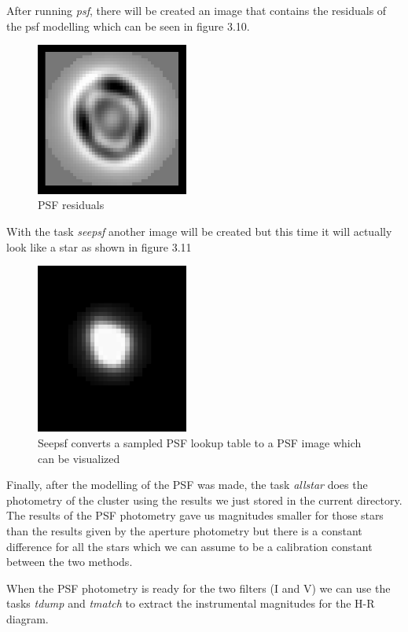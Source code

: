 After running \textit{psf}, there will be created an image that contains the residuals of the psf modelling which can be seen in figure 3.10.

\begin{figure}[H]
\centering
\includegraphics[width=5cm]{images/psf2.png}
\caption[PSF residuals]{PSF residuals}
\end{figure}

With the task \textit{seepsf} another image will be created but this time it will actually look like a star as shown in figure 3.11

\begin{figure}[H]
\centering
\includegraphics[width=5cm]{images/psf3.png}
\caption[PSF image created by the task Seepsf]{Seepsf converts a sampled PSF lookup table to a PSF image which can be visualized}
\end{figure}

Finally, after the modelling of the PSF was made, the task \textit{allstar} does the photometry of the cluster using the results we just stored in the current directory. The results of the PSF photometry gave us magnitudes smaller for those stars than the results given by the aperture photometry but there is a constant difference for all the stars which we can assume to be a calibration constant between the two methods. 

When the PSF photometry is ready for the two filters (I and V) we can use the tasks \textit{tdump} and \textit{tmatch} to extract the instrumental magnitudes for the H-R diagram. 

